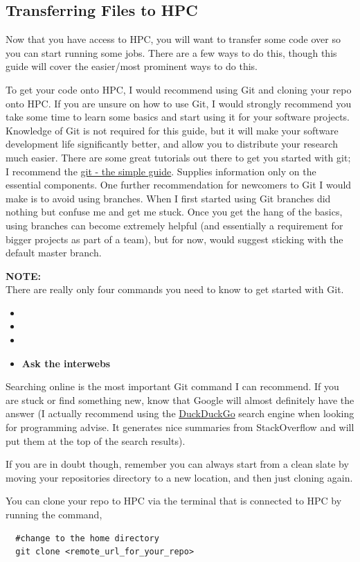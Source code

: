 \subsection{Transferring Files to HPC}
Now that you have access to HPC, you will want to transfer some code over so you can start running some jobs. There are a few ways to do this, though this guide will cover the easier/most prominent ways to do this.
%
%
\par
%
%
To get your code onto HPC, I would recommend using Git and cloning your repo onto HPC. If you are unsure on how to use Git, I would strongly recommend you take some time to learn some basics and start using it for your software projects. Knowledge of Git is not required for this guide, but it will make your software development life significantly better, and allow you to distribute your research much easier. There are some great tutorials out there to get you started with git; I recommend the \href{https://rogerdudler.github.io/git-guide/}{git - the simple guide}. Supplies information only on the essential components. One further recommendation for newcomers to Git I would make is to avoid using branches. When I first started using Git branches did nothing but confuse me and get me stuck. Once you get the hang of the basics, using branches can become extremely helpful (and essentially a requirement for bigger projects as part of a team), but for now, would suggest sticking with the default master branch.
%
%
\begin{story}
  \textbf{NOTE:}
  \\
  There are really only four commands you need to know to get started with Git.
  \begin{itemize}
  \item {}
  \item {}
  \item {}
  \item \textbf{Ask the interwebs}
  \end{itemize}
  Searching online is the most important Git command I can recommend. If you are stuck or find something new,
  know that Google will almost definitely have the answer (I actually recommend using the \href{https://duckduckgo.com/}{DuckDuckGo} search engine when looking for programming advise. It generates nice summaries from StackOverflow and will put them at the top of the search results).
  \par
  If you are in doubt though, remember you can always start from a clean slate by moving your repositories directory to a new location, and then just cloning again.
\end{story}
%
%
\par
%
%
You can clone your repo to HPC via the terminal that is connected to HPC by running the command,
\\
\par
\begin{verbatim}
  #change to the home directory
  git clone <remote_url_for_your_repo>
\end{verbatim}
%
%
